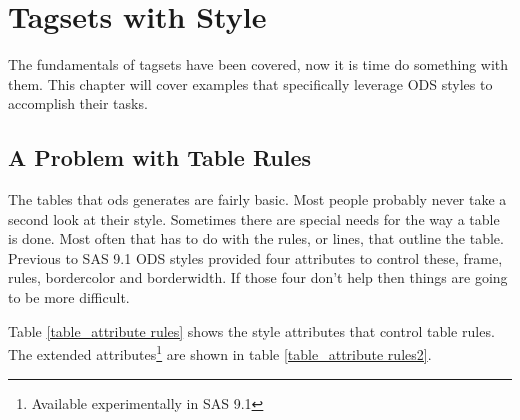 \chapter{Tagsets with Style}
The fundamentals of tagsets have been covered, now it is time
do something with them. 
This chapter will cover examples that specifically leverage
ODS styles to accomplish their tasks.

\section{A Problem with Table Rules}
The tables that ods generates are fairly basic.  Most people 
probably never take a second look at their style.  Sometimes
there are special needs for the way a table is done.  Most
often that has to do with the rules, or lines, that outline
the table.  Previous to SAS 9.1 ODS styles provided four 
attributes to control these, frame, rules, bordercolor 
and borderwidth. If those four don't help then 
things are going to be more difficult.

Table \ref{table_attribute rules} shows the style attributes that control
table rules.  The extended attributes\footnote{Available experimentally in SAS 9.1} 
are shown in table \ref{table_attribute rules2}.

